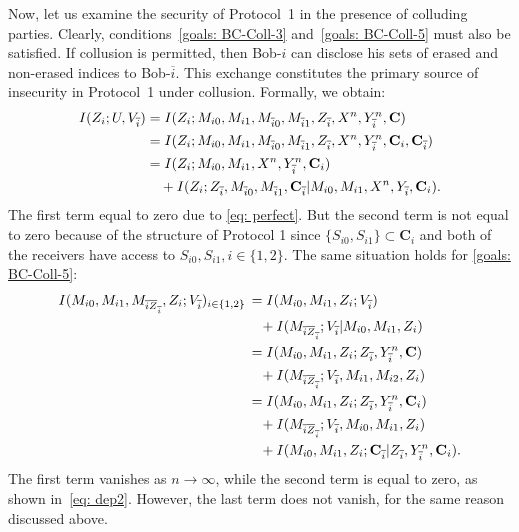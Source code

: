 \documentclass[runningheads]{llncs}
\begin{document}
Now, let us examine the security of Protocol~1 in the presence of colluding parties. Clearly, conditions~\eqref{goals: BC-Coll-3} and~\eqref{goals: BC-Coll-5} must also be satisfied. If collusion is permitted, then Bob-$i$ can disclose his sets of erased and non-erased indices to Bob-$\overline{i}$. This exchange constitutes the primary source of insecurity in Protocol~1 under collusion. Formally, we obtain:
\begin{align}\label{eq: dep}
    I (Z_i; U, V_{\overline{i}}) & = I(Z_i;M_{i0},M_{i1},M_{\overline{i}0},M_{\overline{i}1}, Z_{\overline{i}}, X^n, Y_{\overline{i}}^n, \mathbf{C})\notag\\
    & = I(Z_i;M_{i0},M_{i1},M_{\overline{i}0},M_{\overline{i}1}, Z_{\overline{i}}, X^n, Y_{\overline{i}}^n, \mathbf{C}_i,\mathbf{C}_{\overline{i}})\notag\\
    & = I(Z_i;M_{i0},M_{i1},X^n, Y_{\overline{i}}^n, \mathbf{C}_i)\notag\\
           & \quad + I(Z_i;Z_{\overline{i}},M_{\overline{i}0},M_{\overline{i}1},\mathbf{C}_{\overline{i}}|M_{i0},M_{i1},X^n,Y_{\overline{i}},\mathbf{C}_i).
    \end{align}
The first term equal to zero due to \eqref{eq: perfect}. But the second term is not equal to zero because of the structure of Protocol 1 since $\{S_{i0},S_{i1}\}\subset\mathbf{C}_i$ and both of the receivers have access to $S_{i0},S_{i1}, i\in\{1,2\}$. The same situation holds for \eqref{goals: BC-Coll-5}:
\begin{align}
        I (M_{i0},M_{i1},M_{\overline{i}\overline{Z}_{\overline{i}}}, Z_i; V_{\overline{i}})_{i\in\{1,2\}}&\,= I (M_{i0},M_{i1}, Z_i; V_{\overline{i}})\notag\\
        & \quad + I (M_{\overline{i}\overline{Z}_{\overline{i}}};V_{\overline{i}}|M_{i0},M_{i1}, Z_i)\notag\\
        &\,= I (M_{i0},M_{i1}, Z_i; Z_{\overline{i}},Y^n_{\overline{i}},\mathbf{C})\notag\\
        & \quad + I (M_{\overline{i}\overline{Z}_{\overline{i}}};V_{\overline{i}},M_{i1},M_{i2}, Z_i)\notag\\
        &\,= I (M_{i0},M_{i1}, Z_i; Z_{\overline{i}},Y^n_{\overline{i}},\mathbf{C}_i)\notag\\
        & \quad + I (M_{\overline{i}\overline{Z}_{\overline{i}}};V_{\overline{i}},M_{i0},M_{i1}, Z_i )\notag\\
        & \quad+ I (M_{i0},M_{i1}, Z_i;\mathbf{C}_{\overline{i}}| Z_{\overline{i}},Y^n_{\overline{i}},\mathbf{C}_i).
\end{align}
The first term vanishes as $n \to \infty$, while the second term is equal to zero, as shown in~\eqref{eq: dep2}. However, the last term does not vanish, for the same reason discussed above.
  
\end{document}
